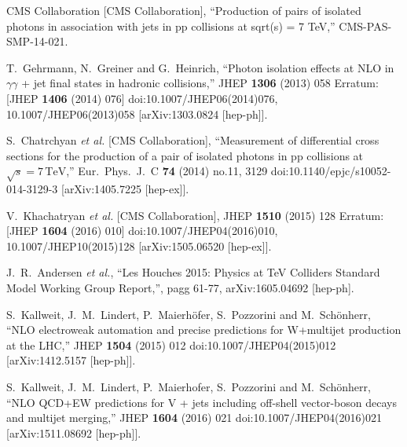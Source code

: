 \documentclass{PoS}
\begin{document}
\begin{thebibliography}{99}
  CMS Collaboration [CMS Collaboration],
  ``Production of pairs of isolated photons in association with jets in pp collisions at sqrt(s) = 7 TeV,''
  CMS-PAS-SMP-14-021.

  T.~Gehrmann, N.~Greiner and G.~Heinrich,
  ``Photon isolation effects at NLO in $\gamma \gamma$ + jet final states in hadronic collisions,''
  JHEP {\bf 1306} (2013) 058
   Erratum: [JHEP {\bf 1406} (2014) 076]
  doi:10.1007/JHEP06(2014)076, 10.1007/JHEP06(2013)058
  [arXiv:1303.0824 [hep-ph]].

  S.~Chatrchyan {\it et al.} [CMS Collaboration],
  ``Measurement of differential cross sections for the production of a pair of isolated photons in pp collisions at $\sqrt{s}=7\,\text {TeV} $,''
  Eur.\ Phys.\ J.\ C {\bf 74} (2014) no.11,  3129
  doi:10.1140/epjc/s10052-014-3129-3
  [arXiv:1405.7225 [hep-ex]].

  V.~Khachatryan {\it et al.} [CMS Collaboration],
  JHEP {\bf 1510} (2015) 128
   Erratum: [JHEP {\bf 1604} (2016) 010]
  doi:10.1007/JHEP04(2016)010, 10.1007/JHEP10(2015)128
  [arXiv:1505.06520 [hep-ex]].

  J.~R.~Andersen {\it et al.},
  ``Les Houches 2015: Physics at TeV Colliders Standard Model Working Group Report,'', pagg 61-77,
  arXiv:1605.04692 [hep-ph].

  S.~Kallweit, J.~M.~Lindert, P.~Maierhöfer, S.~Pozzorini and M.~Schönherr,
  ``NLO electroweak automation and precise predictions for W+multijet production at the LHC,''
  JHEP {\bf 1504} (2015) 012
  doi:10.1007/JHEP04(2015)012
  [arXiv:1412.5157 [hep-ph]].

  S.~Kallweit, J.~M.~Lindert, P.~Maierhofer, S.~Pozzorini and M.~Schönherr,
  ``NLO QCD+EW predictions for V + jets including off-shell vector-boson decays and multijet merging,''
  JHEP {\bf 1604} (2016) 021
  doi:10.1007/JHEP04(2016)021
  [arXiv:1511.08692 [hep-ph]].

\end{thebibliography}
\end{document}
